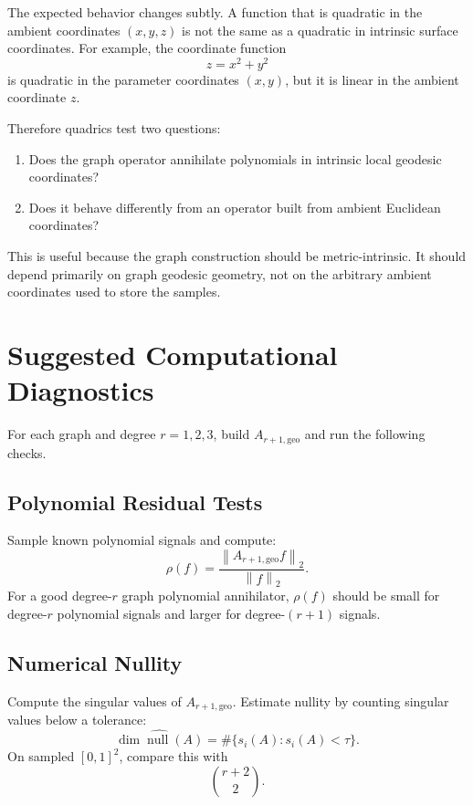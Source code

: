 \documentclass[11pt]{article}
\newcommand{\norm}[1]{\left\lVert #1 \right\rVert}
\newcommand{\nullsp}{\operatorname{null}}
\begin{document}
The expected behavior changes subtly.  A function that is quadratic in the
ambient coordinates \((x,y,z)\) is not the same as a quadratic in intrinsic
surface coordinates.  For example, the coordinate function
\[
  z=x^2+y^2
\]
is quadratic in the parameter coordinates \((x,y)\), but it is linear in the
ambient coordinate \(z\).

Therefore quadrics test two questions:

\begin{enumerate}
  \item Does the graph operator annihilate polynomials in intrinsic local
        geodesic coordinates?
  \item Does it behave differently from an operator built from ambient
        Euclidean coordinates?
\end{enumerate}

This is useful because the graph construction should be metric-intrinsic.  It
should depend primarily on graph geodesic geometry, not on the arbitrary
ambient coordinates used to store the samples.

\section{Suggested Computational Diagnostics}

For each graph and degree \(r=1,2,3\), build \(A_{r+1,\mathrm{geo}}\) and run
the following checks.

\subsection{Polynomial Residual Tests}

Sample known polynomial signals and compute:
\[
  \rho(f)
  =
  \frac{\norm{A_{r+1,\mathrm{geo}}f}_2}
       {\norm{f}_2}.
\]
For a good degree-\(r\) graph polynomial annihilator, \(\rho(f)\) should be
small for degree-\(r\) polynomial signals and larger for degree-\((r+1)\)
signals.

\subsection{Numerical Nullity}

Compute the singular values of \(A_{r+1,\mathrm{geo}}\).  Estimate nullity by
counting singular values below a tolerance:
\[
  \widehat{\dim\nullsp(A)}
  =
  \#\{s_i(A): s_i(A) < \tau\}.
\]
On sampled \([0,1]^2\), compare this with
\[
  \binom{r+2}{2}.
\]
\end{document}
